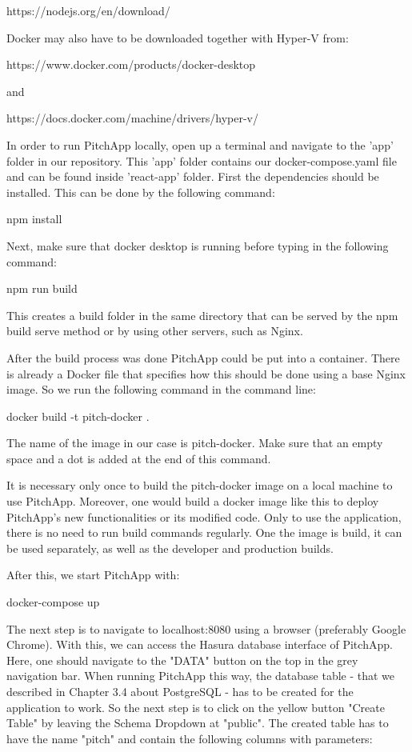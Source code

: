 https://nodejs.org/en/download/

Docker may also have to be downloaded together with Hyper-V from:

https://www.docker.com/products/docker-desktop

and

https://docs.docker.com/machine/drivers/hyper-v/

In order to run PitchApp locally, open up a terminal and navigate to the 'app' folder in our repository. This 'app' folder contains our docker-compose.yaml file and can be found inside 'react-app' folder. First the dependencies should be installed. This can be done by the following command:

npm install

Next, make sure that docker desktop is running before typing in the following command:

npm run build

This creates a build folder in the same directory that can be served by the npm build serve method or by using other servers, such as Nginx.

After the build process was done PitchApp could be put into a container. There is already a Docker file that specifies how this should be done using a base Nginx image. So we run the following command in the command line:

docker build -t pitch-docker .

The name of the image in our case is pitch-docker. Make sure that an empty space and a dot is added at the end of this command.

It is necessary only once to build the pitch-docker image on a local machine to use PitchApp.
Moreover, one would build a docker image like this to deploy PitchApp's new functionalities or its modified code. Only to use the application, there is no need to run build commands regularly.
One the image is build, it can be used separately, as well as the developer and production builds.

After this, we start PitchApp with:

docker-compose up

The next step is to navigate to localhost:8080 using a browser (preferably Google Chrome). With this, we can access the Hasura database interface of PitchApp. Here, one should navigate to the "DATA" button on the top in the grey navigation bar. When running PitchApp this way, the database table - that we described in Chapter 3.4 about PostgreSQL - has to be created for the application to work. So the next step is to click on the yellow button "Create Table" by leaving the Schema Dropdown at "public". The created table has to have the name "pitch" and contain the following columns with parameters:

